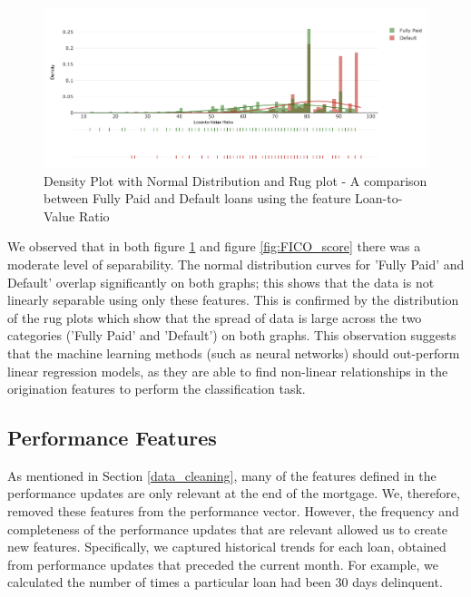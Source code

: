             \begin{figure}[H]
                \centering
                \hspace*{-0.5cm}\includegraphics[width=1.1\textwidth]{Images/ltv_dist.png}
                \caption{Density Plot with Normal Distribution and Rug plot - A comparison between Fully Paid and Default loans using the feature Loan-to-Value Ratio}
                \label{fig:ltv}
            \end{figure}
            
            We observed that in both figure \ref{fig:ltv} and figure \ref{fig:FICO_score} there was a moderate level of separability. The normal distribution curves for 'Fully Paid' and Default' overlap significantly on both graphs; this shows that the data is not linearly separable using only these features. This is confirmed by the distribution of the rug plots which show that the spread of data is large across the two categories ('Fully Paid' and 'Default') on both graphs. This observation suggests that the machine learning methods (such as neural networks) should out-perform linear regression models, as they are able to find non-linear relationships in the origination features to perform the classification task. 
    
        \subsection{Performance Features} \label{monthly_update_features}
            As mentioned in Section \ref{data_cleaning}, many of the features defined in the performance updates are only relevant at the end of the mortgage. We, therefore, removed these features from the performance vector. However, the frequency and completeness of the performance updates that are relevant allowed us to create new features. Specifically, we captured historical trends for each loan, obtained from performance updates that preceded the current month. For example, we calculated the number of times a particular loan had been 30 days delinquent. 
            
